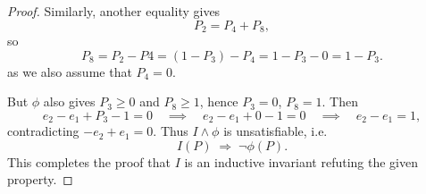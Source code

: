 \begin{proof}
	
	  Similarly, another equality gives
	\[
	P_{2}=P_{4}+P_{8},
	\]
	so
	\[
	P_{8}=P_2-P4=(1-P_{3})-P_{4}=1-P_{3}-0=1-P_3.
	\]
	as we also assume that $P_4=0$.
	
	
	But $\phi$ also gives $P_{3}\ge0$ and $P_{8}\ge1$, hence $P_{3}=0$, $P_{8}=1$.  Then
	\[
	e_{2}-e_{1}+P_{3}-1=0 \quad \implies \quad e_{2}-e_{1}+0-1=0
	\quad\implies\quad
	e_{2}-e_{1}=1,
	\]
	contradicting $-e_{2}+e_{1}=0$.  Thus $I\land\phi$ is unsatisfiable, i.e.\ 
	\[
	I(P)\;\Longrightarrow\;\neg\phi(P).
	\]
	This completes the proof that $I$ is an inductive invariant refuting the given property.
\end{proof}


\newpage